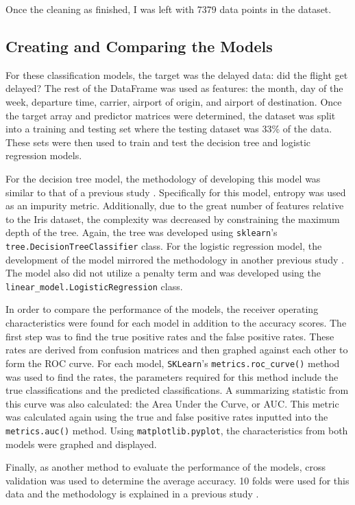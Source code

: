 \documentclass[journal]{IEEEtran}
\begin{document}
Once the cleaning as finished, I was left with 7379 data points in the dataset. 

\subsection{Creating and Comparing the Models}

For these classification models, the target was the delayed data: did the flight get delayed? The rest of the DataFrame was used as features: the month, day of the week, departure time, carrier, airport of origin, and airport of destination. Once the target array and predictor matrices were determined, the dataset was split into a training and testing set where the testing dataset was 33\% of the data. These sets were then used to train and test the decision tree and logistic regression models. 

For the decision tree model, the methodology of developing this model was similar to that of a previous study \cite{b3}. Specifically for this model, entropy was used as an impurity metric. Additionally, due to the great number of features relative to the Iris dataset, the complexity was decreased by constraining the maximum depth of the tree. Again, the tree was developed using \lstinline{sklearn}'s \lstinline{tree.DecisionTreeClassifier} class. For the logistic regression model, the development of the model mirrored the methodology in another previous study \cite{b4}. The model also did not utilize a penalty term and was developed using the \lstinline{linear_model.LogisticRegression} class. 

In order to compare the performance of the models, the receiver operating characteristics were found for each model in addition to the accuracy scores. The first step was to find the true positive rates and the false positive rates. These rates are derived from confusion matrices and then graphed against each other to form the ROC curve. For each model, \lstinline{SKLearn}'s \lstinline{metrics.roc_curve()} method was used to find the rates, the parameters required for this method include the true classifications and the predicted classifications. A summarizing statistic from this curve was also calculated: the Area Under the Curve, or AUC. This metric was calculated again using the true and false positive rates inputted into the \lstinline{metrics.auc()} method. Using \lstinline{matplotlib.pyplot}, the characteristics from both models were graphed and displayed. 

Finally, as another method to evaluate the performance of the models, cross validation was used to determine the average accuracy. 10 folds were used for this data and the methodology is explained in a previous study \cite{b5}. 
\end{document}
